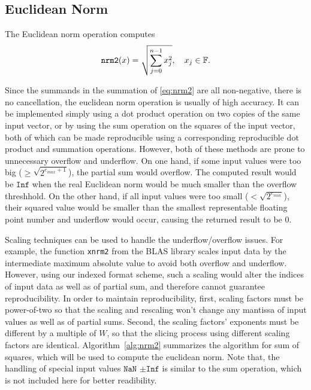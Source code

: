 \subsection{Euclidean Norm}
  \label{sec:compositeops_nrm}
    
    The Euclidean norm operation computes
    \begin{equation}
        \texttt{nrm2}(x) = \sqrt{\sum_{j=0}^{n-1} x_j^2}, \quad x_j \in \mathbb{F}.
        \label{eq:nrm2}
    \end{equation}

    Since the summands in the summation of \eqref{eq:nrm2} are all non-negative,
    there is no cancellation, the euclidean norm operation
    is usually of high accuracy.
    It can be implemented simply using a dot product operation on two copies of the same input vector,
    or by using the sum operation on the squares of the input vector,
    both of which can be made reproducible using a corresponding reproducible
    dot product and summation operations. However, both of these methods are prone to unnecessary overflow and underflow.
    On one hand, if some input values were too big ($\geq \sqrt{2^{e_{max}+1}}$),
    the partial sum would overflow. The computed result would
    be $\texttt{Inf}$ when the real Euclidean norm would be much smaller than the
    overflow threshhold.
    On the other hand, if all input values were too small ($ < \sqrt{2^{e_{min}}}$),
    their squared value would be smaller than the smallest representable floating point number and 
    underflow would occur, causing the returned result to be 0.

    Scaling techniques can be used to handle the underflow/overflow issues.
    For example, the function \texttt{xnrm2} from the BLAS library \cite{BLAS}
    scales input data by the intermediate maximum absolute value
    to avoid both overflow and underflow.
    However, using our indexed format scheme, such a scaling would alter
    the indices of input data as well as of partial sum, and therefore
    cannot guarantee reproducibility.
    In order to maintain reproducibility, 
    first, scaling factors must be power-of-two so that the scaling and rescaling
    won't change any mantissa of input values as well as of partial sums.
    Second, the scaling factors' exponents must be different by a multiple of $W$,
    so that the slicing process using different scaling factors are identical.
    Algorithm~\ref{alg:nrm2} summarizes the algorithm for sum of squares,
    which will be used to compute the euclidean norm.
    Note that, the handling of special input values $\texttt{NaN}$ $\pm \texttt{Inf}$
    is similar to the sum operation, which is not included here for better readibility.

